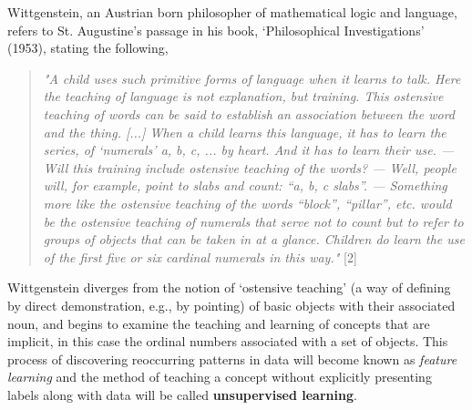 \documentclass[12pt]{article}
\begin{document}
\noindent
Wittgenstein, an Austrian born philosopher of mathematical logic and language, refers to St. Augustine's passage in his book, `Philosophical Investigations' (1953), stating the following,
\begin{quotation}
\noindent
\textit{
"A child uses such primitive forms of language when it learns to talk. Here the teaching of language is not explanation, but training. This ostensive teaching of words can be said to establish an association between the word and the thing. [...] When a child learns this language, it has to learn the series, of `numerals' a, b, c, ... by heart. And it has to learn their use. — Will this training include ostensive teaching of the words? — Well, people will, for example, point to slabs and count: ``a, b, c slabs''. — Something more like the ostensive teaching of the words ``block'', ``pillar'', etc. would be the ostensive teaching of numerals that serve not to count but to refer to groups of objects that can be taken in at a glance. Children do learn the use of the first five or six cardinal numerals in this way."} [2]

\end{quotation}
\noindent
Wittgenstein diverges from the notion of `ostensive teaching' (a way of defining by direct demonstration,  e.g., by pointing) of basic objects with their associated noun, and begins to examine the teaching and learning of concepts that are implicit, in this case the ordinal numbers associated with a set of objects. This process of discovering reoccurring patterns in data will become known as \textit{feature learning} and the method of teaching a concept without explicitly presenting labels along with data will be called \textbf{unsupervised learning}.
\\
\end{document}
